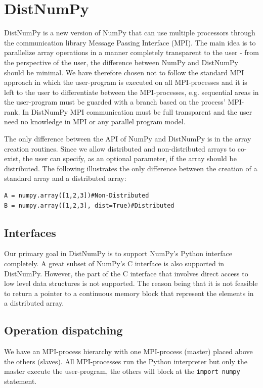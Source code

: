 \documentclass[10pt]{article}
\begin{document}
\section{DistNumPy}
DistNumPy\cite{distnumpy09} is a new version of NumPy that can use multiple processors through the communication library Message Passing Interface (MPI)\cite{mpi}. The main idea is to parallelize array operations in a manner completely transparent to the user - from the perspective of the user, the difference between NumPy and DistNumPy should be minimal. We have therefore chosen not to follow the standard MPI approach in which the user-program is executed on all MPI-processes and it is left to the user to differentiate between the MPI-processes, e.g. sequential areas in the user-program must be guarded with a branch based on the process' MPI-rank. In DistNumPy MPI communication must be full transparent and the user need no knowledge in MPI or any parallel program model.

The only difference between the API of NumPy and DistNumPy is in the array creation routines. Since we allow distributed and non-distributed arrays to co-exist, the user can specify, as an optional parameter, if the array should be distributed. The following illustrates the only difference between the creation of a standard array and a distributed array:
\lstset{frame=none, xleftmargin=0mm, numbers=none}
\begin{lstlisting}
A = numpy.array([1,2,3])#Non-Distributed
B = numpy.array([1,2,3], dist=True)#Distributed
\end{lstlisting}
\lstset{frame=single, xleftmargin=5mm, numbers=left}


\subsection{Interfaces}
Our primary goal in DistNumPy is to support NumPy's Python interface completely. A great subset of NumPy's C interface is also supported in DistNumPy. However, the part of the C interface that involves direct access to low level data structures is not supported. The reason being that it is not feasible to return a pointer to a continuous memory block that represent the elements in a distributed array.


\subsection{Operation dispatching}
We have an MPI-process hierarchy with one MPI-process (master) placed above the others (slaves). All MPI-processes run the Python interpreter but only the master execute the user-program, the others will block at the \texttt{import numpy} statement. 
\end{document}
